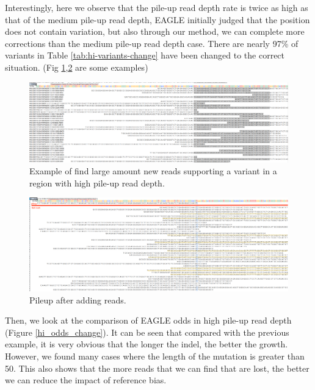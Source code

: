 Interestingly, here we observe that the pile-up read depth rate is twice as high as that of the medium pile-up read depth, EAGLE initially judged that the position does not contain variation, but also through our method, we can complete more corrections than the medium pile-up read depth case. There are nearly 97\% of variants in Table \ref{tab:hi-variants-change} have been changed to the correct situation. (Fig \ref{hi_new_REFread},\ref{hi_pileup_REFread} are some examples)

\vspace{1cm}
\begin{figure}[H]
    \centering
    \includegraphics[width=1\columnwidth]{body/image/hi_new_REFread.png}
    \captionsetup{labelfont=bf}
    \renewcommand{\baselinestretch}{1.0}
    \vspace{-1cm}
    \caption[New reads in a region with high pile-up read depth]{Example of find large amount new reads supporting a variant in a region with high pile-up read depth.}
    \label{hi_new_REFread}
\end{figure}
\vspace{0.5cm}
\begin{figure}[H]
    \centering
    \includegraphics[width=1\columnwidth]{body/image/hi_pileup_REFread.png}
    \captionsetup{labelfont=bf}
    \renewcommand{\baselinestretch}{1.0}
    \vspace{-1cm}
    \caption[variant pileup in high pile-up read depth]{Pileup after adding reads.}
    \label{hi_pileup_REFread}
\end{figure}

Then, we look at the comparison of EAGLE odds in high pile-up read depth (Figure \ref{hi_odds_change}). It can be seen that compared with the previous example, it is very obvious that the longer the indel, the better the growth. However, we found many cases where the length of the mutation is greater than 50. This also shows that the more reads that we can find that are lost, the better we can reduce the impact of reference bias.

